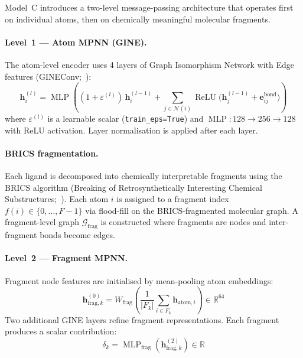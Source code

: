 \documentclass[11pt]{article}
\begin{document}
Model~C introduces a two-level message-passing architecture that operates
first on individual atoms, then on chemically meaningful molecular fragments.

\paragraph{Level~1 --- Atom MPNN (GINE).}
The atom-level encoder uses 4 layers of Graph Isomorphism Network with
Edge features (GINEConv;~\cite{hu2020strategies}):
\begin{equation}
  \mathbf{h}_i^{(l)} = \operatorname{MLP}\!\left(
    (1 + \varepsilon^{(l)})\, \mathbf{h}_i^{(l-1)}
    + \sum_{j \in \mathcal{N}(i)}
    \operatorname{ReLU}\!\bigl(
      \mathbf{h}_j^{(l-1)} + \mathbf{e}_{ij}^{\mathrm{bond}}
    \bigr)
  \right) \label{eq:gine}
\end{equation}
where $\varepsilon^{(l)}$ is a learnable scalar (\texttt{train\_eps=True})
and $\operatorname{MLP}: 128 \to 256 \to 128$ with ReLU activation.
Layer normalisation is applied after each layer.

\paragraph{BRICS fragmentation.}
Each ligand is decomposed into chemically interpretable fragments using the
BRICS algorithm (Breaking of Retrosynthetically Interesting Chemical Substructures;~\cite{degen2008brics}).
Each atom $i$ is assigned to a fragment index $f(i) \in \{0, \ldots, F-1\}$
via flood-fill on the BRICS-fragmented molecular graph.
A fragment-level graph $\mathcal{G}_{\mathrm{frag}}$ is constructed where
fragments are nodes and inter-fragment bonds become edges.

\paragraph{Level~2 --- Fragment MPNN.}
Fragment node features are initialised by mean-pooling atom embeddings:
\begin{equation}
  \mathbf{h}_{\mathrm{frag},k}^{(0)} = W_{\mathrm{frag}}\!\left(
    \frac{1}{|F_k|} \sum_{i \in F_k} \mathbf{h}_{\mathrm{atom},i}
  \right) \in \mathbb{R}^{64}
\end{equation}
Two additional GINE layers refine fragment representations.
Each fragment produces a scalar contribution:
\begin{equation}
  \delta_k = \operatorname{MLP}_{\mathrm{frag}}(
    \mathbf{h}_{\mathrm{frag},k}^{(2)}) \in \mathbb{R}
\end{equation}
\end{document}
